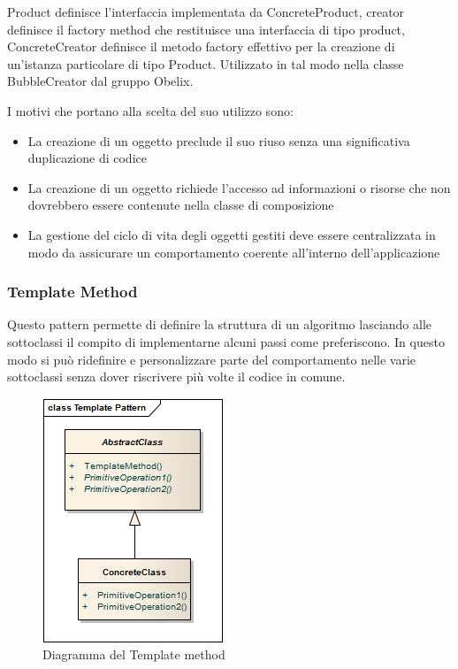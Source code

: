 Product definisce l'interfaccia implementata da ConcreteProduct,
creator definisce il factory method che restituisce una interfaccia di
tipo product, ConcreteCreator definisce il metodo factory effettivo
per la creazione di un’istanza particolare di tipo Product. 
Utilizzato in tal modo nella classe BubbleCreator dal gruppo Obelix.


I motivi che portano alla scelta del suo utilizzo sono:

\begin{itemize}
\item La creazione di un oggetto preclude il suo riuso senza una significativa duplicazione di codice
\item  La creazione di un oggetto richiede l'accesso ad informazioni o risorse che non dovrebbero essere contenute nella classe di composizione
\item La gestione del ciclo di vita degli oggetti gestiti deve essere centralizzata in modo da assicurare un comportamento coerente all'interno dell'applicazione

\end{itemize}

\subsubsection{Template Method}
Questo pattern permette di definire la struttura di un algoritmo lasciando alle sottoclassi il compito di implementarne alcuni passi come preferiscono. In questo modo si può ridefinire e personalizzare parte del comportamento nelle varie sottoclassi senza dover riscrivere più volte il codice in comune.

	\FloatBarrier
	\begin{figure}[ht]
		\centering
		\includegraphics[scale=0.45]{img/template-pattern.png}
		\caption{Diagramma del Template method}
	\end{figure}



